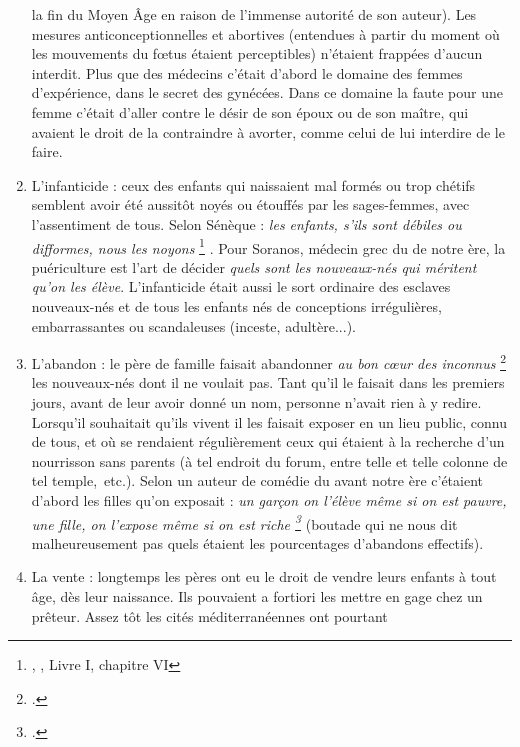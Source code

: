 \begin{enumerate}
la fin du Moyen Âge en raison de l'immense autorité de son auteur).
Les mesures anticonceptionnelles et abortives (entendues à partir du
moment où les mouvements du fœtus étaient perceptibles) n'étaient
frappées d'aucun interdit. Plus que des médecins c'était d'abord le domaine
des femmes d'expérience, dans le secret des gynécées. Dans ce
domaine la faute pour une femme c'était d'aller contre le désir de son
époux ou de son maître, qui avaient le droit de la contraindre à avorter,
comme celui de lui interdire de le faire.
\item L'infanticide : ceux des enfants qui naissaient mal formés ou
trop chétifs semblent avoir été aussitôt noyés ou étouffés par les sages-femmes,
avec l'assentiment de tous. Selon Sénèque : {\emph{les enfants, s'ils sont
débiles ou difformes, nous les noyons}%
\footnote{, , Livre I, chapitre VI}%
}.
Pour \hbox{Soranos}, médecin grec du
 de notre ère, la puériculture est l'art de décider {\emph{quels sont les
nouveaux-nés qui méritent qu'on les élève}}. L'infanticide était aussi le sort ordinaire
des esclaves nouveaux-nés et de tous les enfants nés de conceptions
irrégulières, embarrassantes ou scandaleuses (inceste, adultère...).
\item L'abandon : le père de famille faisait abandonner {\emph{au bon cœur
des inconnus}%
\footcite{boswel1993}%
} les nou\-veaux-nés dont il ne voulait pas. Tant qu'il le faisait
dans les premiers jours, avant de leur avoir donné un nom, personne
n'avait rien à y redire. Lorsqu'il souhaitait qu'ils vivent il les faisait exposer
en un lieu public, connu de tous, et où se rendaient régulièrement
ceux qui étaient à la recherche d'un nourrisson sans parents (à tel endroit
du forum, entre telle et telle colonne de tel temple,~etc.). Selon un auteur
de comédie du  avant notre ère c'étaient d'abord les filles
qu'on exposait : {\emph{un garçon on l'élève même si on est pauvre, une fille, on l'expose
même si on est riche%
\footcite[Cité par][]{corvisier2000}%
}} (boutade qui ne nous dit malheureusement pas
quels étaient les pourcentages d'abandons effectifs).
\item La vente : longtemps les pères ont eu le droit de vendre leurs
enfants à tout âge, dès leur naissance. Ils pouvaient a fortiori les mettre
en gage chez un prêteur. Assez tôt les cités méditerranéennes ont pourtant

\end{enumerate}
